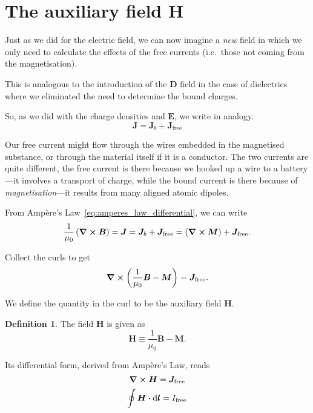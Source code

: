 \documentclass[12pt,chapterprefix=false,dvipsnames]{scrbook}
\theoremstyle{dotless}
\theoremstyle{definition}
\newtheorem{protodefinition}{Definition}[section]
\newenvironment{definition}
{\colorlet{shadecolor}{black!15}\begin{shaded}\begin{protodefinition}}
			{\end{protodefinition}\end{shaded}}
\begin{document}
\section{The auxiliary field H}%
\label{sec:the_auxiliary_field_h}

Just as we did for the electric field, we can now imagine a
\textit{new} field in which we only need to
calculate the effects of the free currents (i.e.\ those not
coming from the magnetisation).

This is analogous to the introduction of the
$\bm{D}$ field in the case of dielectrics where
we eliminated the need to determine the bound charges.

So, as we did with the charge densities and
$\bm{E}$, we write in analogy.
\begin{equation}
	\bm{J} = \bm{J}_b +
	\bm{J}_{\mathrm{free}}
\end{equation}

Our free current might flow through the wires embedded in the
magnetised substance, or through the material itself if it is a
conductor. The two currents are quite different, the free
current is there because we hooked up a wire to a battery---it
involves a transport of charge, while the bound current is there
because of \textit{magnetisation}---it results from many
aligned atomic dipoles.

From Ampère's Law~\ref{eq:amperes_law_differential}, we can write
\begin{equation}
	\frac{1}{\mu_{0}}\left(\curl{\bm{B}}\right)
	=
	\bm{J}
	=
	\bm{J}_b +
	\bm{J}_{\mathrm{free}}
	=
	\left(\curl{\bm{M}}\right) +
	\bm{J}_{\mathrm{free}}.
\end{equation}

Collect the curls to get
\begin{equation}
	\curl{\left(\frac{1}{\mu_{0}}\bm{B} - \bm{M}\right)}
	=
	\bm{J}_{\mathrm{free}}.
\end{equation}

We define the quantity in the curl to be the auxiliary field
$\bm{H}$.

\begin{definition}
	The field $\bm{H}$ is given as
	\begin{equation}
		\label{eq:auxiliary_field_h}
		\bm{H}
		\equiv
		\frac{1}{\mu_{0}}\bm{B} -
		\bm{M}.
	\end{equation}

	Its differential form, derived from Ampère's Law, reads
	\begin{equation}
		\label{eq:auxiliary_field_differential}
		\curl{\bm{H}} =
		\bm{J}_{\mathrm{free}}
	\end{equation}
	\begin{equation}
		\label{eq:auxiliary_field_integral}
		\oint\bm{H}\vdot\dd{\bm{l}}
		=
		I_{\mathrm{free}}
	\end{equation}
\end{definition}
\end{document}
